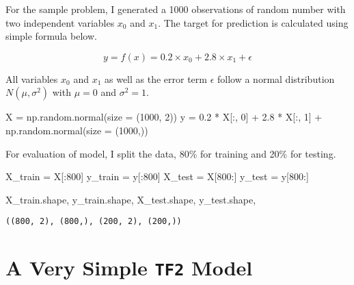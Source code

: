 \documentclass[
  letterpaper,
  DIV=11,
  numbers=noendperiod]{scrreprt}
\newenvironment{Shaded}{\begin{snugshade}}{\end{snugshade}}
\newcommand{\DecValTok}[1]{\textcolor[rgb]{0.68,0.00,0.00}{#1}}
\newcommand{\FloatTok}[1]{\textcolor[rgb]{0.68,0.00,0.00}{#1}}
\newcommand{\NormalTok}[1]{\textcolor[rgb]{0.00,0.23,0.31}{#1}}
\newcommand{\OperatorTok}[1]{\textcolor[rgb]{0.37,0.37,0.37}{#1}}
\begin{document}
For the sample problem, I generated a 1000 observations of random number
with two independent variables \(x_0\) and \(x_1\). The target for
prediction is calculated using simple formula below.

\[
    y = f(x) = 0.2 \times x_0 + 2.8 \times x_1 + \epsilon 
\]

All variables \(x_0\) and \(x_1\) as well as the error term \(\epsilon\)
follow a normal distribution \(N(\mu, \sigma^2)\) with \(\mu = 0\) and
\(\sigma^2 = 1\).

\begin{Shaded}
\begin{Highlighting}[]
\NormalTok{X }\OperatorTok{=}\NormalTok{ np.random.normal(size }\OperatorTok{=}\NormalTok{ (}\DecValTok{1000}\NormalTok{, }\DecValTok{2}\NormalTok{))}
\NormalTok{y }\OperatorTok{=} \FloatTok{0.2} \OperatorTok{*}\NormalTok{ X[:, }\DecValTok{0}\NormalTok{] }\OperatorTok{+} \FloatTok{2.8} \OperatorTok{*}\NormalTok{ X[:, }\DecValTok{1}\NormalTok{] }\OperatorTok{+}\NormalTok{ np.random.normal(size }\OperatorTok{=}\NormalTok{ (}\DecValTok{1000}\NormalTok{,))}
\end{Highlighting}
\end{Shaded}

For evaluation of model, I split the data, 80\% for training and 20\%
for testing.

\begin{Shaded}
\begin{Highlighting}[]
\NormalTok{X\_train }\OperatorTok{=}\NormalTok{ X[:}\DecValTok{800}\NormalTok{]}
\NormalTok{y\_train }\OperatorTok{=}\NormalTok{ y[:}\DecValTok{800}\NormalTok{]}
\NormalTok{X\_test }\OperatorTok{=}\NormalTok{ X[}\DecValTok{800}\NormalTok{:]}
\NormalTok{y\_test }\OperatorTok{=}\NormalTok{ y[}\DecValTok{800}\NormalTok{:]}

\NormalTok{X\_train.shape, y\_train.shape, X\_test.shape, y\_test.shape, }
\end{Highlighting}
\end{Shaded}

\begin{verbatim}
((800, 2), (800,), (200, 2), (200,))
\end{verbatim}

\hypertarget{a-very-simple-tf2-model}{%
\section{\texorpdfstring{A Very Simple \texttt{TF2}
Model}{A Very Simple TF2 Model}}\label{a-very-simple-tf2-model}}
\end{document}
